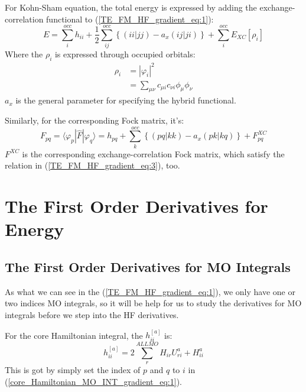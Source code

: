 For Kohn-Sham equation, the total energy is expressed by adding the
exchange-correlation functional to (\ref{TE_FM_HF_gradient_eq:1}):
\begin{equation}
 \label{TE_FM_HF_gradient_eq:4}
E = \sum_{i}^{occ}h_{ii} + \frac{1}{2}
    \sum_{ij}^{occ}
    \left \{ ( ii|jj) - a_{x}( ij|ji)
    \right \} + \sum_{i}^{occ}E_{XC}[\rho_{i}] 
\end{equation}
Where the $\rho_{i}$ is expressed through occupied orbitals:
\begin{equation}
 \begin{split}
  \rho_{i} &= |\varphi_{i}|^{2} \\
              &= \sum_{\mu\nu}c_{\mu i}c_{\nu i}\phi_{\mu}\phi_{\nu}
 \end{split}
 \label{TE_FM_HF_gradient_eq:5}
\end{equation}
$a_{x}$ is the general parameter for specifying the hybrid functional.

Similarly, for the corresponding Fock matrix, it's:
\begin{equation}
\label{TE_FM_HF_gradient_eq:6}
F_{pq} = \langle\varphi_{p}|\hat{F}|\varphi_{q}\rangle = h_{pq} + 
\sum_{k}^{occ}\left \{  (pq|kk) - a_{x}( pk|kq)\right \} + F^{XC}_{pq} 
\end{equation}
$F^{XC}$ is the corresponding exchange-correlation Fock matrix, which satisfy
the relation in (\ref{TE_FM_HF_gradient_eq:3}), too.

 
\section{The First Order Derivatives for Energy}
%
%
%
\subsection{The First Order Derivatives for MO Integrals}
%
%
%
As what we can see in the (\ref{TE_FM_HF_gradient_eq:1}), we only
have one or two indices MO integrals, so it will be help for us to study the
derivatives for MO integrals before we step into the HF derivatives.

For the core Hamiltonian integral, the $h_{ii}^{[a]}$ is:
\begin{equation}
 \label{1st_MO_energy_HF_gradient_eq:1}
h_{ii}^{[a]} = 2\sum_{r}^{ALL MO}H_{ir}U^{a}_{ri} + H^{a}_{ii}
\end{equation}
This is got by simply set the index of $p$ and $q$ to $i$ in
(\ref{core_Hamiltonian_MO_INT_gradient_eq:1}).

